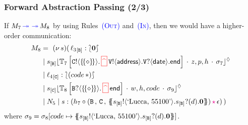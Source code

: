 \documentclass[12pt]{beamer}
\newcommand{\myctxr}[2]{{#1\left[\textcolor{black}{#2}\right]}}
\newcommand{\pS}{\ensuremath{\mathtt{V}}\xspace}
\newcommand{\thunkt}{\ensuremath\{\!\{\diamond\}\!\}}
\newcommand{\fwcolor}[1]{\textcolor{blue}{#1}}
\newcommand{\sepcolor}[1]{\textcolor{magenta}{#1}}
\newcommand{\upd}[2]{[#1\mapsto #2]}
\newcommand{\sred}[1]{\textcolor{myred}{#1}}
\newcommand{\news}[1]{(\nu\, #1)}
\newcommand{\queue}[1]{\lfloor #1 \rfloor}
\newcommand{\store}{\sigma}
\newcommand{\ctx}[1]{\mathbb{#1}}
\newcommand{\mysepp}{\,\cdot\,}
\newcommand{\codah}[4]{\coda{#1}{(#2\,\history\,#3)\!#4}}
\newcommand{\history}{\sepcolor{\mathbf{\star}}}
\newcommand{\coda}[2]{#1:#2}
\newcommand{\lend}{\mathsf{end}}
\newcommand{\gpart}[1]{\mathtt{#1}}
\newcommand{\hmoni}[4]{\ensuremath{{#1\queue{\textcolor{black}{#2}\mysepp #3\mysepp #4}^{\normark}}}}
\newcommand{\past}{\,\text{\textcolor{red}{\textbf{\textasciicircum}}}\,}
\newcommand{\mypast}{\,\sred{\framebox[3mm]{\past}\,}}
\newcommand{\conf}[2]{\lbag #2 \rbag} %
\newcommand{\ltout}[3]{\gpart{#1}!\langle#2\rangle.#3}
\newcommand{\ltinp}[3]{\gpart{#1}?\langle#2\rangle.#3}
\newcommand{\outses}{!}
\newcommand{\inpses}{?}
\newcommand{\Par}{\;|\;}
\newcommand{\emp}{\epsilon}
\newcommand{\valueq}[3]{(#1 \,,\, #2 \,,\,#3)}
\newcommand{\freev}[1]{\langle #1\rangle}
\newcommand{\boundv}[1]{(#1)}
\newcommand{\shsep}{.}
\newcommand{\cons}{\circ}
\newcommand{\appl}[2]{#1\, {#2}}
\newcommand{\bout}[2]{#1 \outses \freev{#2} \shsep}
\newcommand{\binp}[2]{#1 \inpses \boundv{#2} \shsep}
\newcommand{\fw}{\ensuremath{\fwcolor{\,\twoheadrightarrow\,}}}
\newcommand{\key}[2]{#1_{[#2]}}
\newcommand{\np}[2]{#1:#2}
\newcommand{\ep}[2]{#1_{[#2]}}
\newcommand{\loc}{\ell}
\newcommand{\normark}{\lozenge}
\newcommand{\inact}{\mathbf{0}}
\newcommand{\epB}{\ep{s}{\mathtt{B}}}
\newcommand{\pB}{\ensuremath{\mathtt{B}}\xspace}
\newcommand{\pC}{\ensuremath{\mathtt{C}}\xspace}
\newcommand{\thunkp}[1]{\ensuremath\{\!\!\{#1\}\!\!\}}
\newcommand{\dummyn}{\ensuremath{\ast}}
\begin{document}
\begin{frame}
\frametitle{Forward Abstraction Passing (2/3)}

If $M_7 \fw \fw M_8$ by using Rules~\fwcolor{\textsc{(Out)}} and~\fwcolor{\textsc{(In)}}, then
we would have a higher-order communication:
\begin{align*}
M_8 & = ~   \news{s}(\,  \np{\key{{\loc_3}}{\pB}}{ \conf{\inact}{\inact}} 
\\
& \Par \hmoni{\ep{s}{\pB}}{\myctxr{\ctx{T}_7}{\ltout{C}{\thunkt}{\mypast\ltout{\pS}{\mathsf{address}}{\ltinp{\pS}{\mathsf{date}}{\lend}}}}}{z,p,h}{\store_7} 
\\
& \Par \np{\key{{\loc_4}}{\pC}}{ \conf{\inact}{(\appl{code}{\dummyn}) }} 
\\
& \Par 
\hmoni{\ep{s}{\pC}}{\myctxr{\ctx{T}_8}{ \ltinp{B}{\thunkt}{\mypast\lend}}}{w,h,code}{\store_9} 
\\
& 
\Par N_5 \Par \codah{s}{h_7 \cons \valueq{\pB}{\pC}{\thunkp{\bout{\epB}{\text{`Lucca, 55100'}}\binp{\epB}{d}\inact}}}{\emp}{}~) 
\end{align*}
where
$\store_9 = \store_8 \upd{code}{\thunkp{\bout{\epB}{\text{`Lucca, 55100'}}\binp{\epB}{d}\inact}}$.

\end{frame}
\end{document}

